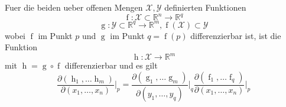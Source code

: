 Fuer die beiden ueber offenen Mengen $\mathcal{X}, \mathcal{Y}$ definierten Funktionen
$$\operatorname{f} : \mathcal{X} \subset \mathbb{R}^n \to \mathbb{R}^q$$ 
$$\operatorname{g} : \mathcal{Y} \subset \mathbb{R}^q \to \mathbb{R}^m, \operatorname{f}(\mathcal{X}) \subset \mathcal{Y}$$
wobei $\operatorname{f}$ im Punkt $p$ und $\operatorname{g}$ im Punkt $q = \operatorname{f}(p)$ differenzierbar ist, ist die Funktion
$$\operatorname{h} : \mathcal{X} \to \mathbb{R}^m$$ 
mit $\operatorname{h} = \operatorname{g} \circ \operatorname{f}$ differenzierbar und es gilt
$$\frac{\partial (\operatorname{h}_1, \dots \operatorname{h}_m)}{\partial (x_1, \dots, x_n)} \bigg|_p = \frac{\partial (\operatorname{g}_1, \dots \operatorname{g}_m)}{\partial (y_1, \dots, y_q)} \bigg|_q  \frac{\partial (\operatorname{f}_1, \dots \operatorname{f}_q)}{\partial (x_1, \dots, x_n)} \bigg|_p$$ 
